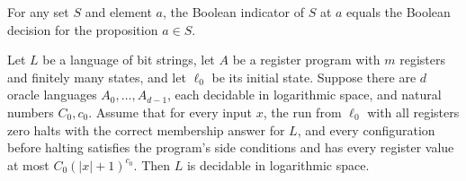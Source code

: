\begin{lemma}
\label{Complexity.LogProg.indicator_eq_decide}
\leanok
{}
For any set $S$ and element $a$, the Boolean indicator of $S$ at $a$ equals the Boolean
decision for the proposition $a\in S$.
\end{lemma}

\begin{theorem}
\label{Complexity.LogProg.arm_decides_poly}
\leanok
{}
Let $L$ be a language of bit strings, let $A$ be a register program with $m$ registers
and finitely many states, and let $\ell_0$ be its initial state. Suppose there are $d$
oracle languages $A_0,\ldots,A_{d-1}$, each decidable in logarithmic space, and natural
numbers $C_0,c_0$. Assume that for every input $x$, the run from $\ell_0$ with all
registers zero halts with the correct membership answer for $L$, and every configuration
before halting satisfies the program's side conditions and has every register value at
most $C_0(|x|+1)^{c_0}$. Then $L$ is decidable in logarithmic space.
\end{theorem}
